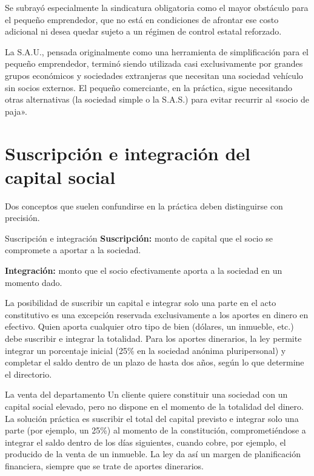 \documentclass[12pt,oneside]{book}
\begin{document}
Se subrayó especialmente la sindicatura obligatoria como el mayor obstáculo para el pequeño emprendedor, que no está en condiciones de afrontar ese costo adicional ni desea quedar sujeto a un régimen de control estatal reforzado.

\begin{important}
La S.A.U., pensada originalmente como una herramienta de simplificación para el pequeño emprendedor, terminó siendo utilizada casi exclusivamente por grandes grupos económicos y sociedades extranjeras que necesitan una sociedad vehículo sin socios externos. El pequeño comerciante, en la práctica, sigue necesitando otras alternativas (la sociedad simple o la S.A.S.) para evitar recurrir al «socio de paja».
\end{important}

\section{Suscripción e integración del capital social}
\label{sec:capital}

Dos conceptos que suelen confundirse en la práctica deben distinguirse con precisión.

\begin{definition}{Suscripción e integración}
\textbf{Suscripción:} monto de capital que el socio se compromete a aportar a la sociedad.

\textbf{Integración:} monto que el socio efectivamente aporta a la sociedad en un momento dado.
\end{definition}

La posibilidad de suscribir un capital e integrar solo una parte en el acto constitutivo es una excepción reservada exclusivamente a los aportes en dinero en efectivo. Quien aporta cualquier otro tipo de bien (dólares, un inmueble, etc.) debe suscribir e integrar la totalidad. Para los aportes dinerarios, la ley permite integrar un porcentaje inicial (25\% en la sociedad anónima pluripersonal) y completar el saldo dentro de un plazo de hasta dos años, según lo que determine el directorio.

\begin{example}{La venta del departamento}
Un cliente quiere constituir una sociedad con un capital social elevado, pero no dispone en el momento de la totalidad del dinero. La solución práctica es suscribir el total del capital previsto e integrar solo una parte (por ejemplo, un 25\%) al momento de la constitución, comprometiéndose a integrar el saldo dentro de los días siguientes, cuando cobre, por ejemplo, el producido de la venta de un inmueble. La ley da así un margen de planificación financiera, siempre que se trate de aportes dinerarios.
\end{example}
\end{document}
